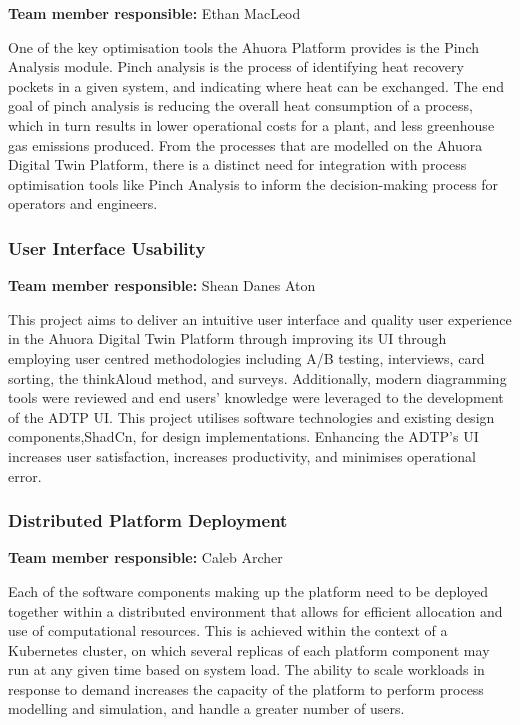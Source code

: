 \textbf{Team member responsible:} Ethan MacLeod

\noindent One of the key optimisation tools the Ahuora Platform provides is the Pinch Analysis module. Pinch analysis is the process of identifying heat recovery pockets in a given system, and indicating where heat can be exchanged. The end goal of pinch analysis is reducing the overall heat consumption of a process, which in turn results in lower operational costs for a plant, and less greenhouse gas emissions produced. From the processes that are modelled on the Ahuora Digital Twin Platform, there is a distinct need for integration with process optimisation tools like Pinch Analysis to inform the decision-making process for operators and engineers.

\subsubsection{User Interface Usability}

\textbf{Team member responsible:} Shean Danes Aton

\noindent This project aims to deliver an intuitive user interface and quality user experience in the Ahuora Digital Twin Platform through improving its UI through employing user centred methodologies including A/B testing, interviews, card sorting, the thinkAloud method, and surveys. Additionally, modern diagramming tools were reviewed and end users' knowledge were leveraged to the development of the ADTP UI. This project utilises software technologies and existing design components,ShadCn, for design implementations. Enhancing the ADTP's UI increases user satisfaction, increases productivity, and minimises operational error.  

\subsubsection{Distributed Platform Deployment}

\textbf{Team member responsible:} Caleb Archer

\noindent Each of the software components making up the platform need to be deployed together within a distributed environment that allows for efficient allocation and use of computational resources. This is achieved within the context of a Kubernetes cluster, on which several replicas of each platform component may run at any given time based on system load. The ability to scale workloads in response to demand increases the capacity of the platform to perform process modelling and simulation, and handle a greater number of users.

